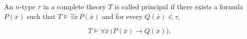 An $n$-type $\tau$ in a complete theory $T$ is called principal if there exists a formula $P(\bar{x})$ such that $T \models \exists \bar{x}\, P(\bar{x})$ and for every $Q(\bar{x}) \in \tau$,

$$T \models \forall \bar{x}\, \big(P(\bar{x}) \to Q(\bar{x})\big).$$
